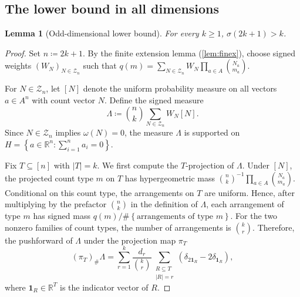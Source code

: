 \documentclass[11pt]{amsart}
\theoremstyle{plain}
\newtheorem{lemma}{Lemma}
\theoremstyle{definition}
\theoremstyle{remark}
\numberwithin{equation}{section}
\newcommand{\R}{\mathbb R}
\newcommand{\1}{\mathbf 1}
\begin{document}
\subsection{The lower bound in all dimensions}

\begin{lemma}[Odd-dimensional lower bound]
For every \(k\ge1\), \(\sigma\left(2k+1\right)>k\).
\end{lemma}

\begin{proof}
Set \(n\coloneqq2k+1\). By the finite extension lemma (\ref{lem:finex}), choose signed weights \(\left(W_N\right)_{N\in\mathcal Z_n}\) such that \(q\left(m\right)=\sum_{N\in\mathcal Z_n}W_N\prod_{a\in A}\binom{N_a}{m_a}\).

For \(N\in\mathcal Z_n\), let \(\left[N\right]\) denote the uniform probability measure on all vectors \(a\in A^n\) with count vector \(N\). Define the signed measure
\[
\Lambda\coloneqq\binom{n}{k}\sum_{N\in\mathcal Z_n}W_N\left[N\right].
\]
Since \(N\in\mathcal Z_n\) implies \(\omega\left(N\right)=0\), the measure \(\Lambda\) is supported on \(H=\left\{a\in\R^n\colon\sum_{i=1}^na_i=0\right\}\).

Fix \(T\subseteq\left[n\right]\) with \(\lvert T\rvert=k\). We first compute the \(T\)-projection of \(\Lambda\). Under \(\left[N\right]\), the projected count type \(m\) on \(T\) has hypergeometric mass \(\binom{n}{k}^{-1}\prod_{a\in A}\binom{N_a}{m_a}\). Conditional on this count type, the arrangements on \(T\) are uniform. Hence, after multiplying by the prefactor \(\binom{n}{k}\) in the definition of \(\Lambda\), each arrangement of type \(m\) has signed mass \(q\left(m\right)/\#\left\{\text{arrangements of type }m\right\}\). For the two nonzero families of count types, the number of arrangements is \(\binom{k}{r}\). Therefore, the pushforward of \(\Lambda\) under the projection map \(\pi_T\)
\[
\left(\pi_T\right)_\#\Lambda=\sum_{r=1}^k\frac{d_r}{\binom{k}{r}}\sum_{\substack{R\subseteq T\\\lvert R\rvert=r}}\left(\delta_{2\1_R}-2\delta_{\1_R}\right),
\]
where \(\1_R\in\R^T\) is the indicator vector of \(R\).


\end{proof}
\end{document}
